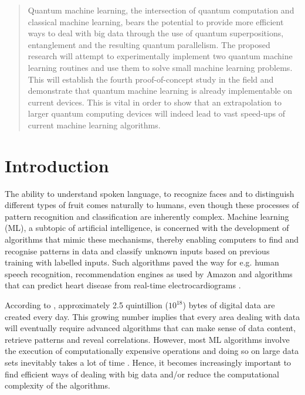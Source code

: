 \documentclass[a4paper]{article}
\newcommand*{\0}{$\ket{0}$}
\newcommand*{\1}{$\ket{1}$}
\begin{document}
\vspace{10.0cm}
\begin{abstract}
Quantum machine learning, the intersection of quantum computation and classical machine learning, bears the potential to provide more efficient ways to deal with big data through the use of quantum superpositions, entanglement and the resulting quantum parallelism. The proposed research will attempt to experimentally implement two quantum machine learning routines and use them to solve small machine learning problems. This will establish the fourth proof-of-concept study in the field and demonstrate that quantum machine learning is already implementable on current devices. This is vital in order to show that an extrapolation to larger quantum computing devices will indeed lead to vast speed-ups of current machine learning algorithms.


\end{abstract}
	\newpage
	\tableofcontents
	\newpage

\section{Introduction}
\label{sec:introduction}


The ability to understand spoken language, to recognize faces and to distinguish different types of fruit comes naturally to humans, even though these processes of pattern recognition and classification are inherently complex. Machine learning (ML), a subtopic of artificial intelligence, is concerned with the development of algorithms that mimic these mechanisms, thereby enabling computers to find and recognise patterns in data and classify unknown inputs based on previous training with labelled inputs. Such algorithms paved the way for e.g. human speech recognition, recommendation engines as used by Amazon and algorithms that can predict heart disease from real-time electrocardiograms \citep{acharya2015integrated, pazzani2007content}.

According to \cite*{bigdata}, approximately 2.5 quintillion (${10}^{18}$) bytes of digital data are created every day. This growing number implies that every area dealing with data will eventually require advanced algorithms that can make sense of data content, retrieve patterns and reveal correlations. However, most ML algorithms involve the execution of computationally expensive operations and doing so on large data sets inevitably takes a lot of time \citep{bekkerman2011scaling}. Hence, it becomes increasingly important to find efficient ways of dealing with big data and/or reduce the computational complexity of the algorithms.
\end{document}
